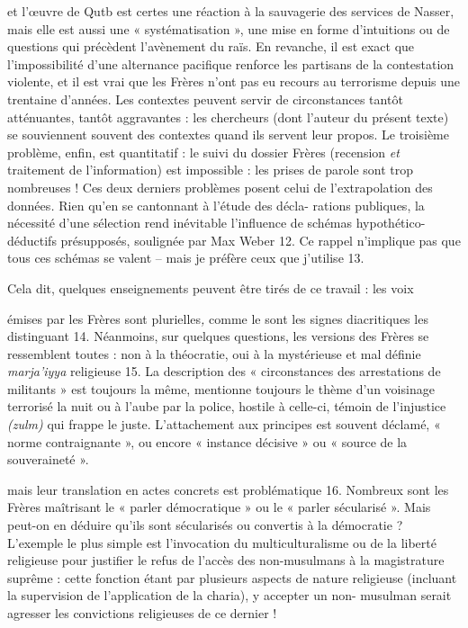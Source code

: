 et l'œuvre de Qutb est certes une réaction à la sauvagerie des services
de Nasser, mais elle est aussi une « systématisation », une mise en
forme d'intuitions ou de questions qui précèdent l'avènement du raïs. En
revanche, il est exact que l'impossibilité d'une alternance pacifique
renforce les partisans de la contestation violente, et il est vrai que
les Frères n'ont pas eu recours au terrorisme depuis une trentaine
d'années. Les contextes peuvent servir de circonstances tantôt
atténuantes, tantôt aggravantes : les chercheurs (dont l'auteur du
présent texte) se souviennent souvent des contextes quand ils servent
leur propos. Le troisième problème, enfin, est quantitatif : le suivi du
dossier Frères (recension \emph{et} traitement de l'information) est
impossible : les prises de parole sont trop nombreuses ! Ces deux
derniers problèmes posent celui de l'extrapolation des données\emph{.}
Rien qu'en se cantonnant à l'étude des décla- rations publiques, la
nécessité d'une sélection rend inévitable l'influence de schémas
hypothético-déductifs présupposés, soulignée par Max Weber 12. Ce rappel
n'implique pas que tous ces schémas se valent -- mais je préfère ceux
que j'utilise 13.

Cela dit, quelques enseignements peuvent être tirés de ce travail : les
voix

émises par les Frères sont plurielles\emph{,} comme le sont les signes
diacritiques les distinguant 14. Néanmoins, sur quelques questions, les
versions des Frères se ressemblent toutes : non à la théocratie, oui à
la mystérieuse et mal définie \emph{marja'iyya} religieuse 15. La
description des « circonstances des arrestations de militants » est
toujours la même, mentionne toujours le thème d'un voisinage terrorisé
la nuit ou à l'aube par la police, hostile à celle-ci, témoin de
l'injustice \emph{(zulm)} qui frappe le juste. L'attachement aux
principes est souvent déclamé,
« norme contraignante », ou encore « instance décisive » ou « source de
la souveraineté ».

mais leur translation en actes concrets est problématique 16. Nombreux
sont les Frères maîtrisant le « parler démocratique » ou le « parler
sécularisé ». Mais peut-on en déduire qu'ils sont sécularisés ou
convertis à la démocratie ? L'exemple le plus simple est l'invocation du
multiculturalisme ou de la liberté religieuse pour justifier le refus de
l'accès des non-musulmans à la magistrature suprême : cette fonction
étant par plusieurs aspects de nature religieuse (incluant la
supervision de l'application de la charia), y accepter un non- musulman
serait agresser les convictions religieuses de ce dernier !
 

